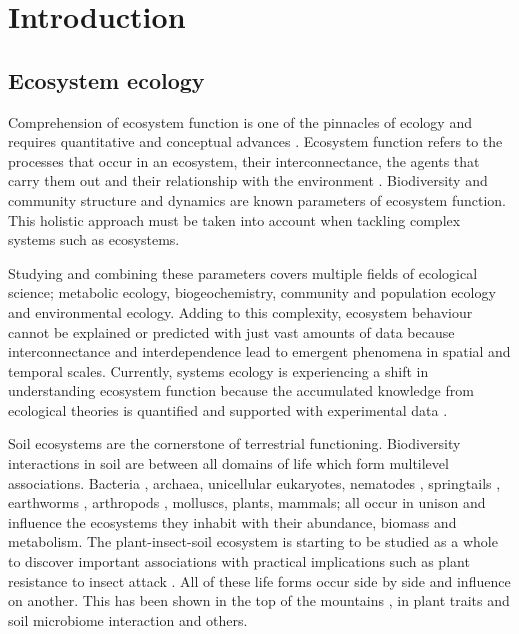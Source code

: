 % 
% 

\chapter{Introduction}
\label{cha:intro}

\section{Ecosystem ecology}
\label{sec:intro-ecosystem}

Comprehension of ecosystem function is one of the pinnacles of ecology and
requires quantitative and conceptual advances \parencite{Chapin_Matson_Vitousek_2011}.
Ecosystem function refers to the processes that occur in an ecosystem, their
interconnectance, the agents that carry them out
and their relationship with the environment \parencite{Chapin_Matson_Vitousek_2011}. Biodiversity
\parencite{hooperEFFECTSBIODIVERSITYECOSYSTEM2005, loreau2001Biodiversity}
and community structure and dynamics \parencite{gonze2018Microbial,morris2020linking}
are known parameters of ecosystem function. This holistic approach must be taken
into account when tackling complex systems such as ecosystems.

Studying and
combining these parameters covers multiple fields of ecological science;
metabolic ecology, biogeochemistry, community and population ecology and
environmental ecology. Adding to this complexity, ecosystem behaviour cannot be
explained or predicted with just vast amounts of data because interconnectance
and interdependence lead to emergent phenomena in spatial and temporal scales.
Currently, systems ecology is experiencing a shift in understanding ecosystem function
because the accumulated knowledge from ecological theories is quantified and
supported with experimental data \parencite{mouquet_review_2015}.

Soil ecosystems are the cornerstone of terrestrial functioning.
Biodiversity interactions in soil are between all domains of life which form
multilevel associations. Bacteria \parencite{Delgado-Baquerizo-atlas}, archaea,
unicellular eukaryotes, nematodes \parencite{vandenHoogen2019},
springtails \parencite{potapov2023Globally}, earthworms \parencite{Phillips2021},
arthropods \parencite{milo-arthropods}, molluscs, plants, mammals; all occur in unison and 
influence the ecosystems they inhabit with their abundance, biomass \parencite{bar2018biomass} and metabolism.
The plant-insect-soil ecosystem is starting to be studied as a whole to discover
important associations with practical implications such as plant resistance 
to insect attack \parencite{plant-insect-soil2023}.
All of these life forms occur side by side and influence on another. This has been shown in the 
top of the mountains \parencite{winkler2018side}, in plant traits and
soil microbiome interaction \parencite{beugnon2022Abiotic} and others. 

